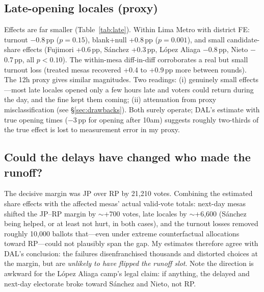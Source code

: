 \documentclass[11pt]{article}
\newcommand{\pp}{\,\text{pp}}
\begin{document}
\subsection{Late-opening locales (proxy)}

Effects are far smaller (Table~\ref{tab:late}). Within Lima Metro with district FE: turnout $-$0.8$\pp$ ($p=0.15$), blank+null +0.8$\pp$ ($p=0.001$), and small candidate-share effects (Fujimori +0.6$\pp$, S\'anchez +0.3$\pp$, L\'opez Aliaga $-$0.8$\pp$, Nieto $-$0.7$\pp$, all $p<0.10$). The within-mesa diff-in-diff corroborates a real but small turnout loss (treated mesas recovered +0.4 to +0.9$\pp$ more between rounds). The 12h proxy gives similar magnitudes. Two readings: (i) genuinely small effects---most late locales opened only a few hours late and voters could return during the day, and the fine kept them coming; (ii) attenuation from proxy misclassification (see \S\ref{sec:drawbacks}). Both surely operate; DAL's estimate with true opening times ($-$3$\pp$ for opening after 10am) suggests roughly two-thirds of the true effect is lost to measurement error in my proxy.

\begin{table}[t!]\centering\footnotesize
\caption{Effects at late-opening locales (transmission-timing proxy). SEs clustered by locale. Columns (2)--(3) use the 6h proxy; (4)--(5) the stricter 12h proxy. *~$p<0.10$, **~$p<0.05$, ***~$p<0.01$.}

\label{tab:late}
\end{table}

\subsection{Could the delays have changed who made the runoff?}

The decisive margin was JP over RP by 21,210 votes. Combining the estimated share effects with the affected mesas' actual valid-vote totals: next-day mesas shifted the JP--RP margin by $\sim$+700 votes, late locales by $\sim$+6,600 (S\'anchez being helped, or at least not hurt, in both cases), and the turnout losses removed roughly 10,000 ballots that---even under extreme counterfactual allocations toward RP---could not plausibly span the gap. My estimates therefore agree with DAL's conclusion: the failures disenfranchised thousands and distorted choices at the margin, but are \emph{unlikely to have flipped the runoff slot}. Note the direction is awkward for the L\'opez Aliaga camp's legal claim: if anything, the delayed and next-day electorate broke toward S\'anchez and Nieto, not RP.
\end{document}
